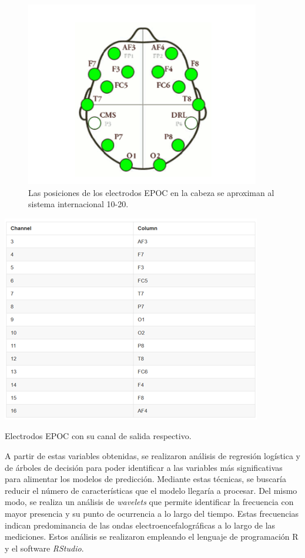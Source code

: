 \begin{figure}
    \centering
    \includegraphics[scale=1]{figuras/Imagen3.png}
    \caption{Las posiciones de los electrodos EPOC en la cabeza se aproximan al sistema internacional 10-20.}
    \label{fig:my_label}
\end{figure}

\begin{table}
    \centering
    \includegraphics[scale=1]{figuras/Imagen4.png}
    \caption{Electrodos EPOC con su canal de salida respectivo.}
    \label{tab:my_label}
\end{table}

A partir de estas variables obtenidas, se realizaron análisis de regresión logística y de árboles de decisión para poder identificar a las variables más significativas para alimentar los modelos de predicción. Mediante estas técnicas, se buscaría reducir el número de características que el modelo llegaría a procesar. Del mismo modo, se realiza un análisis de \textit{wavelets} que permite identificar la frecuencia con mayor presencia y su punto de ocurrencia a lo largo del tiempo. Estas frecuencias indican predominancia de las ondas electroencefalográficas a lo largo de las mediciones. Estos análisis se realizaron empleando el lenguaje de programación R y el software \textit{RStudio}.

